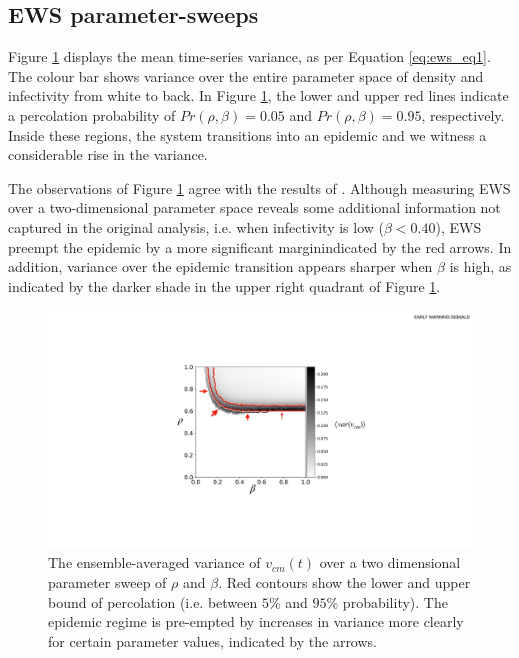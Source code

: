 \subsection{EWS parameter-sweeps}
\label{section:ews_slm}

Figure \ref{fig:ews-results} displays the mean time-series variance, as per Equation \ref{eq:ews_eq1}.
The colour bar shows variance over the entire parameter space of density and infectivity from white to back.
In Figure \ref{fig:ews-results}, the lower and upper red lines indicate a percolation probability of $Pr(\rho, \beta)=0.05$ and $Pr(\rho, \beta)=0.95$, respectively.
Inside these regions, the system transitions into an epidemic and we witness a considerable rise in the variance.

The observations of Figure \ref{fig:ews-results} agree with the results of \cite{OROZCOFUENTES201912}. 
Although measuring EWS over a two-dimensional parameter space reveals some additional information not captured in the original analysis, i.e. when infectivity is low ($\beta<0.40$), EWS preempt the epidemic by a more significant margin\textemdash indicated by the red arrows.
In addition, variance over the epidemic transition appears sharper when $\beta$ is high, as indicated by the darker shade in the upper right quadrant of Figure \ref{fig:ews-results}.

 \begin{figure}
    \centering
    \includegraphics[scale=0.45]{chapter3/figures/figure11.pdf}
    \caption{The ensemble-averaged variance of $v_{cm}(t)$ over a two dimensional parameter sweep of $\rho$ and $\beta$. Red contours show the lower and upper bound of percolation (i.e. between $5\%$ and $95\%$ probability). 
     The epidemic regime is pre-empted by increases in variance more clearly for certain parameter values, %
     indicated by the arrows.}
    \label{fig:ews-results} 
\end{figure}

